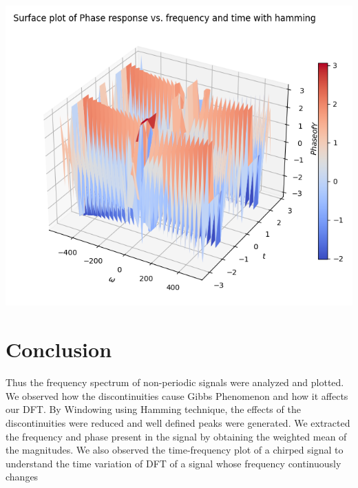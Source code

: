 \documentclass[12pt, a4paper]{report}
\begin{document}
\begin{center}
	\includegraphics[scale=0.55]{Figure_29.png} 
	\label{fig:rawdata}
\end{center}
\clearpage

\section*{Conclusion}
Thus the frequency spectrum of non-periodic signals were analyzed and plotted. We observed how the discontinuities cause Gibbs Phenomenon and how it affects our DFT. By Windowing using Hamming technique, the effects of the discontinuities were reduced and well defined peaks were generated. We extracted the frequency and phase present in the signal by obtaining the weighted mean of the magnitudes. We also observed the time-frequency plot of a chirped signal to understand the time variation of DFT of a signal whose frequency continuously changes
\end{document}

